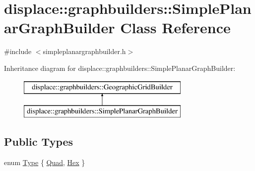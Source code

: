 \hypertarget{classdisplace_1_1graphbuilders_1_1_simple_planar_graph_builder}{}\section{displace\+::graphbuilders\+::Simple\+Planar\+Graph\+Builder Class Reference}
\label{classdisplace_1_1graphbuilders_1_1_simple_planar_graph_builder}


{\ttfamily \#include $<$simpleplanargraphbuilder.\+h$>$}

Inheritance diagram for displace\+::graphbuilders\+::Simple\+Planar\+Graph\+Builder\+:\begin{figure}[H]
\begin{center}
\leavevmode
\includegraphics[height=2.000000cm]{dc/d1f/classdisplace_1_1graphbuilders_1_1_simple_planar_graph_builder}
\end{center}
\end{figure}
\subsection*{Public Types}
\begin{DoxyCompactItemize}
\item 
enum \mbox{\hyperlink{classdisplace_1_1graphbuilders_1_1_simple_planar_graph_builder_aedc525514a7c8f011cb4550c8e4addb7}{Type}} \{ \mbox{\hyperlink{classdisplace_1_1graphbuilders_1_1_simple_planar_graph_builder_aedc525514a7c8f011cb4550c8e4addb7a37e892ed540fcf6c74ea358b02bf3d00}{Quad}}, 
\mbox{\hyperlink{classdisplace_1_1graphbuilders_1_1_simple_planar_graph_builder_aedc525514a7c8f011cb4550c8e4addb7a07363bab8069c4c94ba5939cee58883e}{Hex}}
 \}
\end{DoxyCompactItemize}
